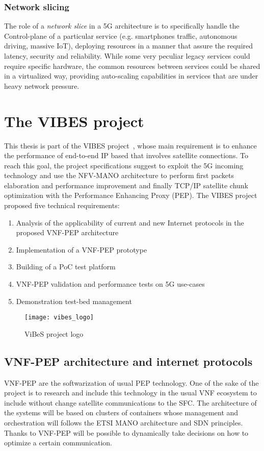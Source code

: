 \subsubsection{Network slicing}
The role of a \emph{network slice} in a 5G architecture is to specifically
handle the Control-plane of a particular service (e.g. smartphones traffic,
autonomous driving, massive IoT), deploying resources in a manner that assure
the required latency, security and reliability. While some very peculiar legacy
services could require specific hardware, the common resources between services
could be shared in a virtualized way, providing auto-scaling capabilities in
services that are under heavy network pressure.

\section{The VIBES project}
This thesis is part of the VIBES project~\cite{vibesesa}, whose main requirement
is to enhance the performance of end-to-end IP based that involves satellite
connections. To reach this goal, the project specifications suggest to exploit
the 5G incoming technology and use the NFV-MANO architecture to perform first
packets elaboration and performance improvement and finally TCP/IP satellite
chunk optimization with the Performance Enhancing Proxy (PEP). The VIBES project
proposed five technical requirements:
\begin{enumerate}
  \item Analysis of the applicability of current and new Internet protocols in
  the proposed VNF-PEP architecture
  \item Implementation of a VNF-PEP prototype
  \item Building of a PoC test platform
  \item VNF-PEP validation and performance tests on 5G use-cases
  \item Demonstration test-bed management
\end{enumerate}

\begin{figure}[t]
 \centering
 \texttt{[image: vibes\_logo]}
 \caption{ViBeS project logo}
 \label{chap:background:img:vibes_logo}
\end{figure}

\subsection{VNF-PEP architecture and internet protocols}
VNF-PEP are the softwarization of usual PEP technology. One of the sake of the
project is to research and include this technology in the usual VNF ecosystem to
include without change satellite communications to the SFC. The architecture of
the systems will be based on clusters of containers whose management and
orchestration will follows the ETSI MANO architecture and SDN principles. Thanks
to VNF-PEP will be possible to dynamically take decisions on how to optimize a
certain communication.

